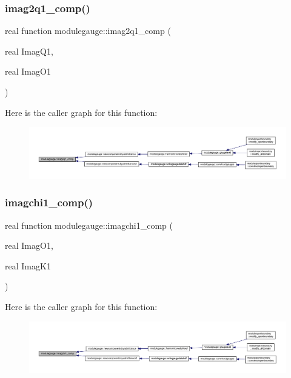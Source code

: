 \subsubsection{\texorpdfstring{imag2q1\+\_\+comp()}{imag2q1\_comp()}}
{\footnotesize\ttfamily real function modulegauge\+::imag2q1\+\_\+comp (\begin{DoxyParamCaption}\item[{real}]{Imag\+Q1,  }\item[{real}]{Imag\+O1 }\end{DoxyParamCaption})\hspace{0.3cm}{\ttfamily [private]}}

Here is the caller graph for this function\+:\nopagebreak
\begin{figure}[H]
\begin{center}
\leavevmode
\includegraphics[width=350pt]{namespacemodulegauge_ab71fe2294ae9095789c94992c6add8bf_icgraph}
\end{center}
\end{figure}
\mbox{\label{namespacemodulegauge_a681cb9c3664a268964c3c3d9e1aaccfd}} 
\subsubsection{\texorpdfstring{imagchi1\+\_\+comp()}{imagchi1\_comp()}}
{\footnotesize\ttfamily real function modulegauge\+::imagchi1\+\_\+comp (\begin{DoxyParamCaption}\item[{real}]{Imag\+O1,  }\item[{real}]{Imag\+K1 }\end{DoxyParamCaption})\hspace{0.3cm}{\ttfamily [private]}}

Here is the caller graph for this function\+:\nopagebreak
\begin{figure}[H]
\begin{center}
\leavevmode
\includegraphics[width=350pt]{namespacemodulegauge_a681cb9c3664a268964c3c3d9e1aaccfd_icgraph}
\end{center}
\end{figure}
\mbox{\label{namespacemodulegauge_a28b6b5b37157cb9ca35800eacb09e7fc}} 
